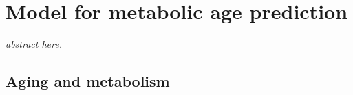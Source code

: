
\chapter{Model for metabolic age prediction} \label{chap:frassoni}

\begin{displayquote}
	\textit{abstract here.}
\end{displayquote}

\section{Aging and metabolism} \label{sec:frassoni_intro}

